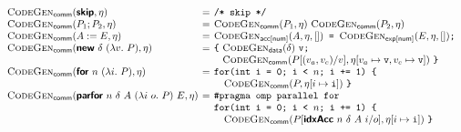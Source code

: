 
\begin{figure}
    \begin{minipage}{1.0\linewidth}
      \begin{displaymath}
        \begin{array}{l@{\hspace{0.4em}}c@{\hspace{0.4em}}l}
          \codegenComm{\prim{skip}, \eta}
          &=& \texttt{/* skip */}
          \\
          \codegenComm{P_1; P_2, \eta}
          &=& \begin{array}[t]{@{}l}
                \codegenComm{P_1, \eta}~\codegenComm{P_2, \eta}
              \end{array}
          \\
          \codegenComm{A := E, \eta}
          &=& \codegenAcc{\num}{A, \eta, []}\texttt{ = }\codegenExp{\num}{E, \eta, []}\texttt{;}
          \\
          \codegenComm{\prim{new}~\delta~(\lambda v.~P), \eta}
          &=& \texttt{\{}~
              \begin{array}[t]{@{}l}
                \codegenData{\delta}~\texttt{v;} \\
                \codegenComm{P[(v_a,v_e)/v], \eta[v_a \mapsto \texttt{v}, v_e \mapsto \texttt{v}]}\ \texttt{\}}
              \end{array}
          \\
          \codegenComm{\prim{for}~n~(\lambda i.~P), \eta}
          &=& \begin{array}[t]{@{}l}
                \texttt{for(int i = 0; i < $n$; i += 1) \{} \\
                \quad \codegenComm{P, \eta[i \mapsto \texttt{i}]} \ \texttt{\}}
              \end{array}
          \\
          \codegenComm{\prim{parfor}~n~\delta~A~(\lambda i~o.~P)~E, \eta}
          &=& \begin{array}[t]{@{}l}
                \texttt{\#pragma omp parallel for}\\
                \texttt{for(int i = 0; i < $n$; i += 1) \{ }\\
                \quad \codegenComm{P[\prim{idxAcc}~n~\delta~A~i/o], \eta[i \mapsto \texttt{i}]}\ \texttt{\}}
              \end{array}
        \end{array}
      \end{displaymath}
      \label{fig:codegen-comm}
    \end{minipage}
  

\end{figure}
